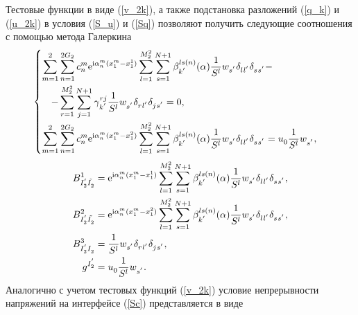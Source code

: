 \documentclass[press]{vestnik}
\begin{document}
Тестовые функции в виде (\ref{v_2k}), а также подстановка разложений (\ref{q_k}) и (\ref{u_2k}) в условия (\ref{S_u}) и (\ref{Sq}) позволяют получить следующие соотношения с помощью метода Галеркина
\begin{equation*}
	\begin{cases}
		\begin{split}
			\sum_{m=1}^{2}& \sum_{n=1}^{2G_{2}} c_{n}^{m} \mathrm{e}^{ {\rm{i}} {\alpha_{n}^{m}} (x_{1}^{m}-x_{1}^{1})}  \sum_{l=1}^{M_{2}^{2}} \sum_{s=1}^{N+1} \beta_{k^{'}}^{ls(n)}(\alpha) \frac{1}{S^{l}} w_{s^{'}} \delta_{l_{}^{} l_{}^{'}} \delta_{s_{}^{} s_{}^{'}}  -
			\\
			-&\sum_{r=1}^{M_{2}^{2}} \sum_{j=1}^{N+1} \gamma_{k^{'}}^{rj} \frac{1}{S^{l}} w_{s^{'}}^{} \delta_{r_{}^{} l_{}^{'}} \delta_{j_{}^{} s_{}^{'}} = 0, 
			\\
			\sum_{m=1}^{2}& \sum_{n=1}^{2G_{2}} c_{n}^{m} \mathrm{e}^{ {\rm{i}} {\alpha_{n}^{m}} (x_{1}^{m}-x_{1}^{2})}  \sum_{l=1}^{M_{2}^{2}} \sum_{s=1}^{N+1} \beta_{k^{'}}^{ls(n)}(\alpha) \frac{1}{S^{l}} w_{s^{'}} \delta_{l_{}^{} l_{}^{'}} \delta_{s_{}^{} s_{}^{'}} = u_{0}^{} \frac{1}{S^{l}} w_{s^{'}}^{},
		\end{split}
	\end{cases}
\end{equation*}
\begin{equation*}
	\begin{split}
		B_{I_{2}^{'}\tilde{I_{2}^{}}}^{1} &= \mathrm{e}^{ {\rm{i}} {\alpha_{n}^{m}} (x_{1}^{m}-x_{1}^{1})}  \sum_{l=1}^{M_{2}^{2}} \sum_{s=1}^{N+1} \beta_{k^{'}}^{ls(n)}(\alpha) \frac{1}{S^{l}} w_{s^{'}} \delta_{l_{}^{} l_{}^{'}} \delta_{s_{}^{} s_{}^{'}}, 
		\\
		B_{I_{2}^{'}\tilde{I_{2}^{}}}^{2} &= \mathrm{e}^{ {\rm{i}} {\alpha_{n}^{m}} (x_{1}^{m}-x_{1}^{2})} \sum_{l=1}^{M_{2}^{2}} \sum_{s=1}^{N+1} \beta_{k^{'}}^{ls(n)}(\alpha) \frac{1}{S^{l}} w_{s^{'}} \delta_{l_{}^{} l_{}^{'}} \delta_{s_{}^{} s_{}^{'}},
		\\
		B_{I_{2}^{'}I_{2}^{}}^{3} &= \frac{1}{S^{l}} w_{s^{'}} \delta_{r_{}^{} l_{}^{'}} \delta_{j_{}^{} s_{}^{'}},\\
		g_{}^{I_{2}^{'}} &= u_{0}^{} \frac{1}{S^{l}} w_{s^{'}}^{}.
	\end{split}
\end{equation*}
Аналогично с учетом тестовых функций (\ref{v_2k}) условие непрерывности напряжений на интерфейсе (\ref{Sc}) представляется в виде
\end{document}
